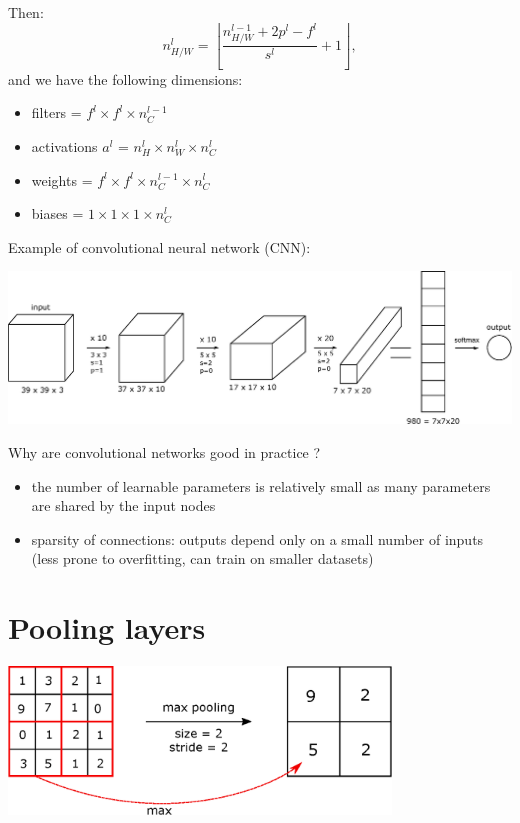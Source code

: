 \documentclass[a4paper,11pt]{report}
\begin{document}
Then: $$ n_{H/W}^l = \left\lfloor \dfrac{n_{H/W}^{l-1} + 2p^l - f^l}{s^l} +1 \right\rfloor,$$
and we have the following dimensions:
\begin{itemize}
  \item filters = $f^l \times f^l \times n_C^{l-1}$
  \item activations $a^l$ = $n_H^{l} \times n_W^{l} \times n_C^{l}$
  \item weights = $f^l \times f^l \times n_C^{l-1} \times n_C^{l}$
  \item biases = $1 \times 1 \times 1 \times n_C^{l}$
\end{itemize}

Example of convolutional neural network (CNN):

\begin{center}
\includegraphics[width = 6in]{convolutions/convnet}
\end{center}

Why are convolutional networks good in practice ?
\begin{itemize}
  \item the number of learnable parameters is relatively small as many parameters are shared by the input nodes
  \item sparsity of connections: outputs depend only on a small number of inputs (less prone to overfitting, can train on smaller datasets)
\end{itemize}

\section{Pooling layers}

\hspace{0.5in}

\begin{center}
\includegraphics[width = 4in]{convolutions/maxpool}
\end{center}
\end{document}
